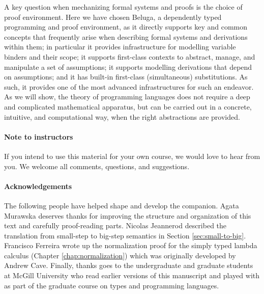 A key question when mechanizing formal systems and proofs is the choice of proof environment.  Here we have chosen Beluga, a dependently typed programming and proof environment, as it directly supports key and common concepts that frequently arise when describing formal systems and derivations within them; in particular it provides infrastructure for modelling variable binders and their scope; it supports first-class contexts to abstract, manage, and manipulate a set of assumptions; it supports modelling derivations that depend on assumptions; and it has built-in first-class (simultaneous) substitutions.  As such, it provides one of the most advanced infrastructures for such an endeavor. As we will show,  the theory of programming languages does
not require a deep and complicated mathematical apparatus, but can be carried out in a concrete, intuitive, and computational way, when the right abstractions are provided.



\paragraph{Note to instructors}
If you intend to use this material for your own course, we would love to hear from you. We welcome all comments, questions, and suggestions.

\paragraph{Acknowledgements} The following people have helped shape
and develop the companion. Agata Murawska deserves thanks for
improving the structure and organization of this text and carefully
proof-reading parts. Nicolas Jeannerod described the translation from
small-step to big-step semantics in Section \ref{sec:small-to-big}. Francisco Ferreira wrote up the normalization
proof for the simply typed lambda calculus (Chapter
\ref{chap:normalization}) which was originally developed by
Andrew Cave. Finally, thanks goes to the undergraduate and graduate
students at McGill University who read earlier versions of this
manuscript and played with \beluga as part of the graduate course on
types and programming languages.



